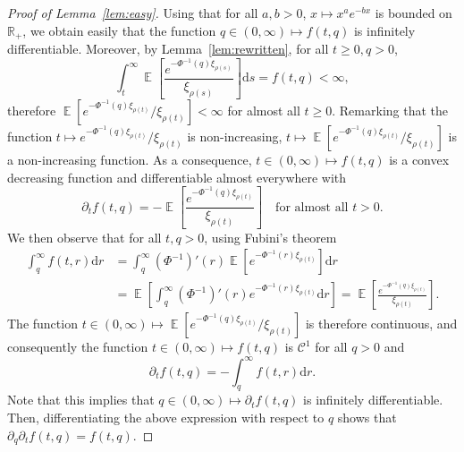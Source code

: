 \documentclass[AHL,Unicode,longabstracts,published]{cedram}
\newcommand{\R}{\mathbb{R}}
\DeclareMathOperator{\E}{\mathbb{E}}
\newcommand{\dd}{\mathrm{d}}
\newcommand{\calC}{\mathcal{C}}
\begin{document}
\begin{proof}[Proof of Lemma~\ref{lem:easy}]
Using that for all $a,b > 0$, $x \mapsto x^{a} e^{-bx}$ is bounded on $\R_+$, we obtain easily that the function $q \in (0,\infty) \mapsto f(t,q)$ is infinitely differentiable. Moreover, by Lemma~\ref{lem:rewritten}, for all $t \geq 0, q>0$,
\[
\int_t^\infty \E\left[\frac{e^{-\Phi^{-1}(q)\xi_{\rho(s)}}}{\xi_{\rho(s)}} \right] \dd s = f(t,q) < \infty,
\]
therefore $\E[e^{-\Phi^{-1}(q)\xi_{\rho(t)}}/\xi_{\rho(t)}] < \infty$ for almost all $t \geq 0$. Remarking that the function $t \mapsto e^{-\Phi^{-1}(q)\xi_{\rho(t)}}/\xi_{\rho(t)}$ is non-increasing, $t \mapsto \E[e^{-\Phi^{-1}(q)\xi_{\rho(t)}}/{\xi_{\rho(t)}}]$ is a non-increasing function. As a consequence, $t \in (0,\infty) \mapsto f(t,q)$ is a convex decreasing function and differentiable almost everywhere with
\[
\partial_t f(t,q) = -\E\left[\frac{e^{-\Phi^{-1}(q)\xi_{\rho(t)}}}{\xi_{\rho(t)}} \right] \quad \text{for almost all $t > 0$}.
\]
We then observe that for all $t,q > 0$, using Fubini's theorem
\begin{align*}
\int_q^\infty f(t,r) \dd r &= \int_q^\infty (\Phi^{-1})'(r)\E\left[e^{-\Phi^{-1}(r) \xi_{\rho(t)}}\right] \dd r \\
&= \E\left[\int_q^\infty (\Phi^{-1})'(r)e^{-\Phi^{-1}(r) \xi_{\rho(t)}} \dd r \right] = \E\left[\frac{e^{-\Phi^{-1}(q)\xi_{\rho(t)}}}{\xi_{\rho(t)}} \right].
\end{align*}
The function $t \in (0,\infty) \mapsto \E[{e^{-\Phi^{-1}(q)\xi_{\rho(t)}}}/{\xi_{\rho(t)}}]$ is therefore continuous, and consequently the function $t \in (0,\infty) \mapsto f(t,q)$ is $\calC^1$ for all $q > 0$ and
\[
\partial_t f(t,q) = -\int_q^\infty f(t,r) \dd r.
\]
Note that this implies that $q \in (0,\infty) \mapsto \partial_t f(t,q)$ is infinitely differentiable. Then, differentiating the above expression with respect to $q$ shows that $\partial_q \partial_t f(t,q) = f(t,q)$.


\end{proof}
\end{document}
